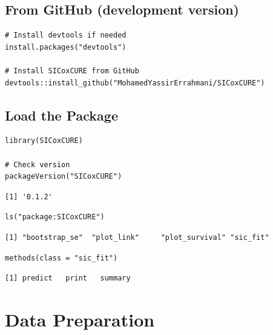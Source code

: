 \documentclass[12pt,a4paper]{article}
\begin{document}
\subsection{From GitHub (development version)}

\begin{lstlisting}[style=Rcode, caption={Installation from GitHub}]
# Install devtools if needed
install.packages("devtools")

# Install SICoxCURE from GitHub
devtools::install_github("MohamedYassirErrahmani/SICoxCURE")
\end{lstlisting}

\subsection{Load the Package}

\begin{lstlisting}[style=Rcode, caption={Loading SICoxCURE}]
library(SICoxCURE)

# Check version
packageVersion("SICoxCURE")
\end{lstlisting}

\begin{lstlisting}[style=Routput, caption={Expected output}]
[1] '0.1.2'
\end{lstlisting}

\begin{lstlisting}[style=Rcode, caption={List available functions}]
ls("package:SICoxCURE")
\end{lstlisting}

\begin{lstlisting}[style=Routput]
[1] "bootstrap_se"  "plot_link"     "plot_survival" "sic_fit"
\end{lstlisting}

\begin{lstlisting}[style=Rcode, caption={Check S3 methods}]
methods(class = "sic_fit")
\end{lstlisting}

\begin{lstlisting}[style=Routput]
[1] predict   print   summary
\end{lstlisting}

\section{Data Preparation}
\end{document}

